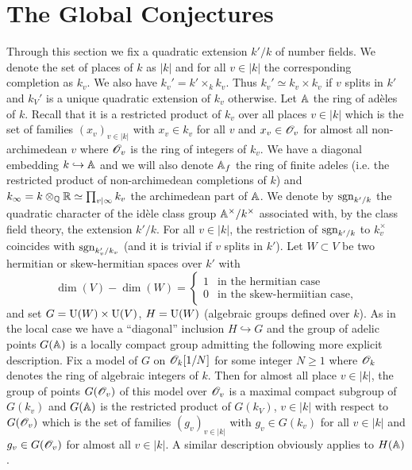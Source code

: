 \section{The Global Conjectures}


Through this section we fix a quadratic extension $k'/k$ of number fields.
We denote the set of places of $k$ as $|k|$ and for all $v \in |k|$ the corresponding completion as $k_v$.
We also have $k_v' = k' \times_k k_v$.
Thus $k_v' \simeq k_v \times k_v$ if $v$ splits in $k'$ and $k_V'$ is a unique quadratic extension of $k_v$ otherwise.
Let $\mathbb{A}$ the ring of ad\`eles of $k$.
Recall that it is a restricted product of $k_v$ over all places $v \in |k|$ which is the set of families $(x_v)_{v\in |k|}$ with $x_v \in k_v$ for all $v$ and $x_v \in \mathscr{O}_v$ for almost all non-archimedean $v$ where $\mathscr{O}_v$ is the ring of integers of $k_v$.
We have a diagonal embedding $k \hookrightarrow \mathbb{A}$ and we will also denote $\mathbb{A}_f$ the ring of finite adeles (i.e. the restricted product of non-archimedean completions of $k$) and $k_\infty = k \otimes_{\mathbb{Q}} \mathbb{R} \simeq \prod_{v|\infty}k_v$ the archimedean part of $\mathbb{A}$.
We denote by $\mathrm{sgn}_{k'/k}$ the quadratic character of the id\`ele class group $\mathbb{A}^\times / k^\times$ associated with, by the class field theory, the extension $k'/k$.
For all $v \in |k|$, the restriction of $\mathrm{sgn}_{k'/k}$ to $k_v^\times$ coincides with $\mathrm{sgn}_{k_v'/k_v}$ (and it is trivial if $v$ splits in $k'$).
Let $W \subset V$ be two hermitian or skew-hermitian spaces over $k'$ with
\[
    \dim(V) - \dim(W) = \begin{cases} 1 & \text{in the hermitian case} \\ 0 & \text{in the skew-hermiitian case},
    \end{cases}
\]
and set $G = \mathrm{U}(W) \times \mathrm{U}(V)$, $H = \mathrm{U}(W)$ (algebraic groups defined over $k$).
As in the local case we have a ``diagonal'' inclusion $H \hookrightarrow G$ and the group of adelic points $G(\mathbb{A})$ is a locally compact group admitting the following more explicit description.
Fix a model of $G$ on $\mathscr{O}_k[1/N]$ for some integer $N \geq 1$ where $\mathscr{O}_k$ denotes the ring of algebraic integers of $k$.
Then for almost all place $v \in |k|$, the group of points $G(\mathscr{O}_v)$ of this model over $\mathscr{O}_v$ is a maximal compact subgroup of $G(k_v)$ and $G(\mathbb{A})$ is the restricted product of $G(k_V)$, $v \in |k|$ with respect to $G(\mathscr{O}_v)$ which is the set of families $(g_v)_{v \in |k|}$ with $g_v \in G(k_v)$ for all $v \in |k|$ and $g_v \in G(\mathscr{O}_v)$ for almost all $v \in |k|$.
A similar description obviously applies to $H(\mathbb{A})$.


